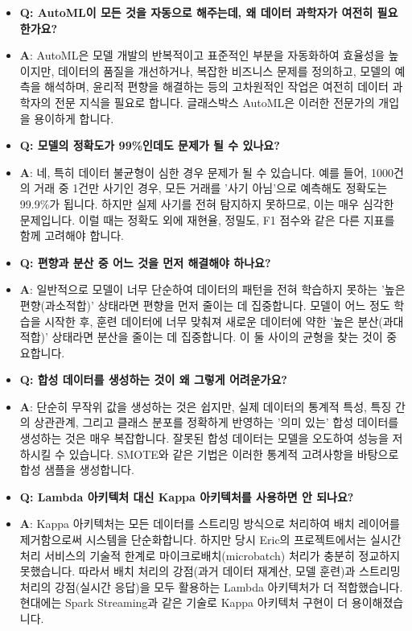 \documentclass[11pt,a4paper]{article}
\begin{document}
\begin{itemize}
\begin{itemize}
\begin{itemize}
\begin{itemize}
\begin{itemize}
\begin{enumerate}
\begin{itemize}
    \item \textbf{Q: AutoML이 모든 것을 자동으로 해주는데, 왜 데이터 과학자가 여전히 필요한가요?}
    \item \textbf{A}: AutoML은 모델 개발의 반복적이고 표준적인 부분을 자동화하여 효율성을 높이지만, 데이터의 품질을 개선하거나, 복잡한 비즈니스 문제를 정의하고, 모델의 예측을 해석하며, 윤리적 편향을 해결하는 등의 고차원적인 작업은 여전히 데이터 과학자의 전문 지식을 필요로 합니다. 글래스박스 AutoML은 이러한 전문가의 개입을 용이하게 합니다.

    \item \textbf{Q: 모델의 정확도가 99\%인데도 문제가 될 수 있나요?}
    \item \textbf{A}: 네, 특히 데이터 불균형이 심한 경우 문제가 될 수 있습니다. 예를 들어, 1000건의 거래 중 1건만 사기인 경우, 모든 거래를 '사기 아님'으로 예측해도 정확도는 99.9\%가 됩니다. 하지만 실제 사기를 전혀 탐지하지 못하므로, 이는 매우 심각한 문제입니다. 이럴 때는 정확도 외에 재현율, 정밀도, F1 점수와 같은 다른 지표를 함께 고려해야 합니다.

    \item \textbf{Q: 편향과 분산 중 어느 것을 먼저 해결해야 하나요?}
    \item \textbf{A}: 일반적으로 모델이 너무 단순하여 데이터의 패턴을 전혀 학습하지 못하는 '높은 편향(과소적합)' 상태라면 편향을 먼저 줄이는 데 집중합니다. 모델이 어느 정도 학습을 시작한 후, 훈련 데이터에 너무 맞춰져 새로운 데이터에 약한 '높은 분산(과대적합)' 상태라면 분산을 줄이는 데 집중합니다. 이 둘 사이의 균형을 찾는 것이 중요합니다.

    \item \textbf{Q: 합성 데이터를 생성하는 것이 왜 그렇게 어려운가요?}
    \item \textbf{A}: 단순히 무작위 값을 생성하는 것은 쉽지만, 실제 데이터의 통계적 특성, 특징 간의 상관관계, 그리고 클래스 분포를 정확하게 반영하는 '의미 있는' 합성 데이터를 생성하는 것은 매우 복잡합니다. 잘못된 합성 데이터는 모델을 오도하여 성능을 저하시킬 수 있습니다. SMOTE와 같은 기법은 이러한 통계적 고려사항을 바탕으로 합성 샘플을 생성합니다.

    \item \textbf{Q: Lambda 아키텍처 대신 Kappa 아키텍처를 사용하면 안 되나요?}
    \item \textbf{A}: Kappa 아키텍처는 모든 데이터를 스트리밍 방식으로 처리하여 배치 레이어를 제거함으로써 시스템을 단순화합니다. 하지만 당시 Eric의 프로젝트에서는 실시간 처리 서비스의 기술적 한계로 마이크로배치(microbatch) 처리가 충분히 정교하지 못했습니다. 따라서 배치 처리의 강점(과거 데이터 재계산, 모델 훈련)과 스트리밍 처리의 강점(실시간 응답)을 모두 활용하는 Lambda 아키텍처가 더 적합했습니다. 현대에는 Spark Streaming과 같은 기술로 Kappa 아키텍처 구현이 더 용이해졌습니다.
\end{itemize}


\end{enumerate}
\end{itemize}
\end{itemize}
\end{itemize}
\end{itemize}
\end{itemize}
\end{document}

